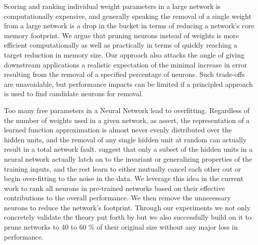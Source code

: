 Scoring and ranking individual weight parameters in a large network is computationally expensive, and generally speaking the removal of a single weight from a large network is a drop in the bucket in terms of reducing a network's core memory footprint.  We argue that pruning neurons instead of weights is more efficient computationally as well as practically in terms of quickly reaching a target reduction in memory size. Our approach also attacks the angle of giving downstream applications a realistic expectation of the minimal increase in error resulting from the removal of a specified percentage of neurons. Such trade-offs are unavoidable, but performance impacts can be limited if a principled approach is used to find candidate neurons for removal. 

Too many free parameters in a Neural Network lead to overfitting. Regardless of the number of weights used in a given network, as \cite{segee1991fault} assert, the representation of a learned function approximation is almost never evenly distributed over the hidden units, and the removal of any single hidden unit at random can actually result in a total network fault. \cite{mozer1989using} suggest that only a subset of the hidden units in a neural network actually latch on to the invariant or generalizing properties of the training inputs, and the rest learn to either mutually cancel each other out or begin over-fitting to the noise in the data. We leverage this idea in the current work to rank all neurons in pre-trained networks based on their effective contributions to the overall performance. We then remove the unnecessary neurons to reduce the network's footprint. Through our experiments we not only concretely validate the theory put forth by \cite{mozer1989using} but we also successfully build on  it to prune networks to 40 to 60 \% of their original size without any major loss in performance.
